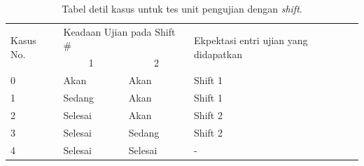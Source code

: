     \begin{table}[]
        \centering
        \begin{tabular}{|l|l|l|l|}
        \hline
        \multirow{2}{*}{Kasus No.} & \multicolumn{2}{l|}{Keadaan Ujian pada
                             Shift \#} & \multirow{2}{*}{Ekpektasi entri ujian
                             yang didapatkan} \\ \cline{2-3} &
                             \multicolumn{1}{c|}{1}  & \multicolumn{1}{c|}{2} &
                             \\ \hline
        0                    & Akan                    & Akan
        & Shift 1                                                \\ \hline
        1                    & Sedang                  & Akan
        & Shift 1                                                \\ \hline
        2                    & Selesai                 & Akan
        & Shift 2                                                \\ \hline
        3                    & Selesai                 & Sedang
        & Shift 2                                                \\ \hline
        4                    & Selesai                 & Selesai
        & -                                                      \\ \hline
        \end{tabular}
        \caption{Tabel detil kasus untuk tes unit pengujian dengan
        \textit{shift}. }
        \label{tab:exam-shift-tc}
    \end{table}
    
